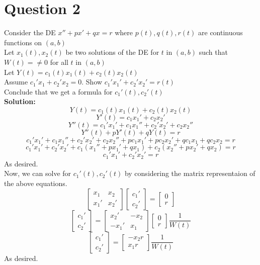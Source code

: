 \documentclass{article}
\begin{document}
\section{Question 2}
Consider the DE $x'' + px' + qx = r$ where $p(t), q(t), r(t)$ are continuous functions on $(a,b)$\\
Let $x_1(t), x_2(t)$ be two solutions of the DE for $t$ in $(a,b)$ such that $W(t) = \neq 0$ for all $t$ in $(a,b)$\\
Let $Y(t) = c_1(t)x_1(t) + c_2(t)x_2(t)$\\
Assume $c_1'x_1 + c_2'x_2 = 0$. Show $c_1'x_1' + c_2'x_2' = r(t)$\\
Conclude that we get a formula for $c_1'(t), c_2'(t)$\\
\textbf{Solution:}\\
$$Y(t) = c_1(t)x_1(t) + c_2(t)x_2(t)$$
$$Y'(t) = c_1x_1' + c_2x_2'$$
$$Y''(t) = c_1'x_1' + c_1x_1'' + c_2'x_2' + c_2x_2'' $$
$$Y''(t) + pY'(t) + qY(t) = r$$
$$c_1'x_1' + c_1x_1'' + c_2'x_2' + c_2x_2'' + pc_1x_1' + pc_2x_2' + qc_1x_1 + qc_2x_2 = r$$
$$c_1'x_1' + c_2'x_2' + c_1(x_1'' + px_1' + qx_1) + c_2(x_2'' + px_2' + qx_2) = r$$
$$c_1'x_1' + c_2'x_2' = r$$ 
As desired.\\
Now, we can solve for $c_1'(t), c_2'(t)$ by considering the matrix representaion of the above equations. \\
$$\begin{bmatrix}
x_1 & x_2\\
x_1' & x_2'
\end{bmatrix} \begin{bmatrix}
c_1'\\
c_2'
\end{bmatrix} = \begin{bmatrix}
0\\
r
\end{bmatrix}$$
$$\begin{bmatrix}
c_1'\\
c_2'
\end{bmatrix} = \begin{bmatrix}
    x_2' & -x_2\\
    -x_1' & x_1
\end{bmatrix} \begin{bmatrix}
0\\
r
\end{bmatrix} \frac{1}{W(t)}$$
$$\begin{bmatrix}
c_1'\\
c_2'
\end{bmatrix} = \begin{bmatrix}
    -x_2r\\
    x_1r
\end{bmatrix} \frac{1}{W(t)}$$
As desired.\\
\end{document}
